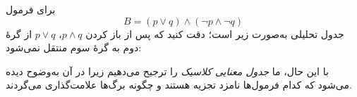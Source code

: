   \begin{example}
  برای فرمول
  \[
  B = (p \lor q) \land (\neg p \land \neg q)
  \]
  جدول تحلیلی به‌صورت زیر است؛ دقت کنید که پس از باز کردن $p \land q$، $p \lor q$ از گرهٔ دوم به گرهٔ سوم منتقل نمی‌شود:
  \\
    \begin{center}
    \begin{latin}
    \end{latin}
    \end{center}
  با این حال، ما \emph{جدول معنایی کلاسیک} را ترجیح می‌دهیم زیرا در آن به‌وضوح دیده می‌شود که کدام فرمول‌ها نامزد تجزیه هستند و چگونه برگ‌ها علامت‌گذاری می‌گردند.
  
  \end{example}